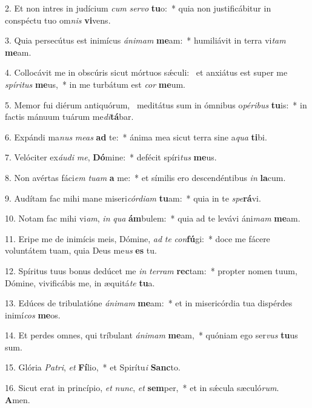 2. Et non intres in judícium \textit{cum} \textit{ser}\textit{vo} \textbf{tu}o:~*  quia non justificábitur in conspéctu tuo om\textit{nis} \textbf{vi}vens.\

3. Quia persecútus est inimícus \textit{á}\textit{ni}\textit{mam} \textbf{me}am:~*  humiliávit in terra vi\textit{tam} \textbf{me}am.\

4. Collocávit me in obscúris sicut mórtuos sǽculi: \dag\  et anxiátus est super me \textit{spí}\textit{ri}\textit{tus} \textbf{me}us,~*  in me turbátum est \textit{cor} \textbf{me}um.\

5. Memor fui diérum antiquórum, \dag\  meditátus sum in ómnibus o\textit{pé}\textit{ri}\textit{bus} \textbf{tu}is:~*  in factis mánuum tuárum me\textit{di}\textbf{tá}bar.\

6. Expándi ma\textit{nus} \textit{me}\textit{as} \textbf{ad} te:~*  ánima mea sicut terra sine a\textit{qua} \textbf{ti}bi.\

7. Velóciter ex\textit{áu}\textit{di} \textit{me}, \textbf{Dó}mine:~*  defécit spíri\textit{tus} \textbf{me}us.\

8. Non avértas fáci\textit{em} \textit{tu}\textit{am} \textbf{a} me:~*  et símilis ero descendéntibus \textit{in} \textbf{la}cum.\

9. Audítam fac mihi mane miseri\textit{cór}\textit{di}\textit{am} \textbf{tu}am:~*  quia in te \textit{spe}\textbf{rá}vi.\

10. Notam fac mihi vi\textit{am}, \textit{in} \textit{qua} \textbf{ám}bulem:~*  quia ad te levávi áni\textit{mam} \textbf{me}am.\

11. Eripe me de inimícis meis, Dómine, \textit{ad} \textit{te} \textit{con}\textbf{fú}gi:~*  doce me fácere voluntátem tuam, quia Deus me\textit{us} \textbf{es} tu.\

12. Spíritus tuus bonus dedúcet me \textit{in} \textit{ter}\textit{ram} \textbf{rec}tam:~*  propter nomen tuum, Dómine, vivificábis me, in æquitá\textit{te} \textbf{tu}a.\

13. Edúces de tribulatióne \textit{á}\textit{ni}\textit{mam} \textbf{me}am:~*  et in misericórdia tua dispérdes inimí\textit{cos} \textbf{me}os.\

14. Et perdes omnes, qui tríbulant \textit{á}\textit{ni}\textit{mam} \textbf{me}am,~*  quóniam ego ser\textit{vus} \textbf{tu}us sum.\

15. Glória \textit{Pa}\textit{tri}, \textit{et} \textbf{Fí}lio,~*  et Spirítu\textit{i} \textbf{Sanc}to.\

16. Sicut erat in princípio, \textit{et} \textit{nunc}, \textit{et} \textbf{sem}per,~*  et in sǽcula sæculó\textit{rum}. \textbf{A}men.\

